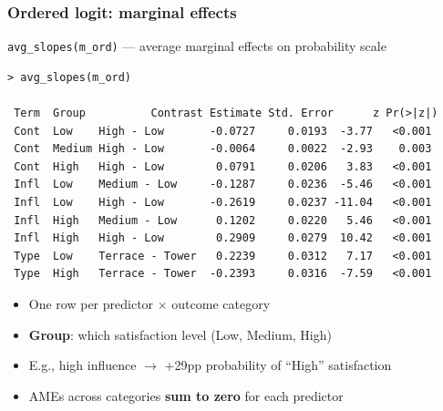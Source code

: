\begin{frame}[fragile]
\frametitle{Ordered logit: marginal effects}
\centering

\vspace{2pt}
{\scriptsize\texttt{avg\_slopes(m\_ord)} --- average marginal effects on probability scale}

\vspace{4pt}

{\fontsize{4.5pt}{5.5pt}\selectfont
\begin{verbatim}
> avg_slopes(m_ord)

 Term  Group          Contrast Estimate Std. Error      z Pr(>|z|)
 Cont  Low    High - Low       -0.0727     0.0193  -3.77   <0.001
 Cont  Medium High - Low       -0.0064     0.0022  -2.93    0.003
 Cont  High   High - Low        0.0791     0.0206   3.83   <0.001
 Infl  Low    Medium - Low     -0.1287     0.0236  -5.46   <0.001
 Infl  Low    High - Low       -0.2619     0.0237 -11.04   <0.001
 Infl  High   Medium - Low      0.1202     0.0220   5.46   <0.001
 Infl  High   High - Low        0.2909     0.0279  10.42   <0.001
 Type  Low    Terrace - Tower   0.2239     0.0312   7.17   <0.001
 Type  High   Terrace - Tower  -0.2393     0.0316  -7.59   <0.001
\end{verbatim}
}

\vspace{4pt}

\begin{itemize}
\item {\small One row per predictor $\times$ outcome category}
\item {\small \textbf{Group}: which satisfaction level (Low, Medium, High)}
\item {\small E.g., high influence $\to$ +29pp probability of ``High'' satisfaction}
\item {\small AMEs across categories \textbf{sum to zero} for each predictor}
\end{itemize}

\end{frame}

